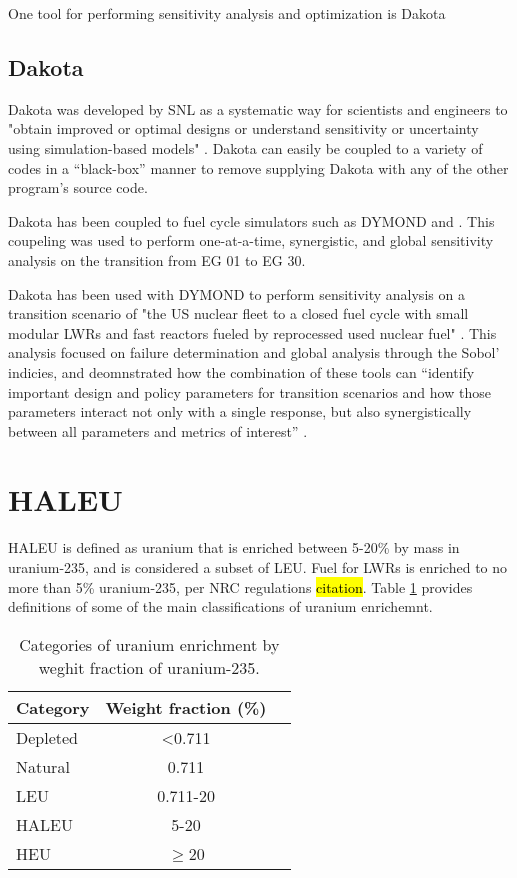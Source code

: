 One tool for performing sensitivity analysis and optimization is 
Dakota \cite{adams_dakota_2019}

\subsection{Dakota}
Dakota was developed by \gls{SNL} as a systematic way for scientists and 
engineers to "obtain improved or optimal designs or understand sensitivity
or uncertainty using simulation-based models" \cite{adams_dakota_2019}.
Dakota can easily be coupled to a variety of codes in a ``black-box'' manner
to remove supplying Dakota with any of the other program's source code. 

Dakota has been coupled to fuel cycle simulators such as DYMOND and \Cyclus 
\cite{chee_sensitivity_2019}. This coupeling was used to perform one-at-a-time, 
synergistic, and global sensitivity analysis on the transition from \gls{EG} 01
to \gls{EG} 30. 

Dakota has been used with DYMOND to perform sensitivity analysis on a transition
scenario of "the US nuclear fleet to a closed fuel cycle with small modular 
\glspl{LWR} and fast reactors fueled by reprocessed used nuclear fuel" 
\cite{richards_application_2021}. This analysis focused on failure determination
and global analysis through the Sobol' indicies, and deomnstrated how the 
combination of these tools can ``identify important design and policy parameters
for transition scenarios and how those parameters interact not only with a single 
response, but also synergistically between all parameters and metrics of 
interest'' \cite{richards_application_2021}. 


\section{HALEU}
\gls{HALEU} is defined as uranium that is enriched between 5-20\% by mass in 
uranium-235, and is considered a subset of \gls{LEU}. Fuel for \glspl{LWR} 
is enriched to no more than 5\% uranium-235, per \gls{NRC} regulations 
\hl{citation}. Table \ref{tab:enrichemnt} provides definitions of some of the 
main classifications of uranium enrichemnt. 

\begin{table}
    \centering
    \caption{Categories of uranium enrichment by weghit fraction of 
    uranium-235.}
    \label{tab:enrichemnt}
    \begin{tabular}{l c c}
        \hline
        Category & Weight fraction (\%)\\\hline
        Depleted & <0.711 \\
        Natural & 0.711 \\
        \gls{LEU} & 0.711-20 \\
        \gls{HALEU} & 5-20 \\
        \gls{HEU} & $\ge$20 \\
        \hline
    \end{tabular}
\end{table}

